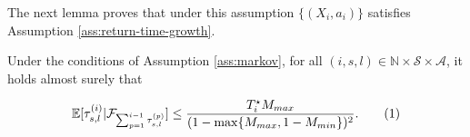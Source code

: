 \documentclass[twoside,11pt]{article}
\newcommand{\pow}[1]{^{(#1)}}%
\numberwithin{equation}{section}
\newcommand{\Nbb}{\mathbb{N}}
\newcommand{\Fcal}{\mathcal{F}}
\newcommand{\naturalset}{\Nbb}
\newcommand\numberthis{\addtocounter{equation}{1}\tag{\theequation}}
\newcommand{\expec}{\mathbb{E}}
\begin{document}
The next lemma proves that under this assumption $\{(X_i,a_i)\}$ satisfies Assumption \ref{ass:return-time-growth}.
\begin{lemma}\label{lemma:return-time-markov}
Under the conditions of Assumption \ref{ass:markov}, for all $(i,s,l)\in\naturalset\times\mathcal{S}\times\mathcal{A}$, it holds almost surely that

    \begin{align*}
    \expec[\tau_{s,l}^{(i)}|\Fcal_{\sum_{p=1}^{i-1} \tau_{s,l}\pow{p}}] \leq \frac{T_i^\star M_{max}}{(1-\max\{M_{max},1-M_{min}\})^2}.\numberthis\label{eq:markov-eq3}         
    \end{align*}

\end{lemma}
\end{document}
